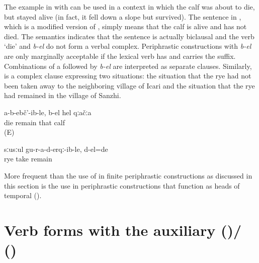 The example in  with  can be used in a context in which the calf was about to die, but stayed alive (in fact, it fell down a slope but survived). The sentence in , which is a modified version of , simply means that the calf is alive and has not died. The semantics indicates that the sentence is actually biclausal and the verb `die' and \textit{b-el} do not form a verbal complex. Periphrastic constructions with \textit{b-el} are only marginally acceptable if the lexical verb has  and carries the  suffix. Combinations of a  followed by \textit{b-el} are interpreted as separate clauses. Similarly,  is a complex clause expressing two situations: the situation that the rye had not been taken away to the neighboring village of Icari and the situation that the rye had remained in the village of Sanzhi. 

\begin{exe}
	\ex	\label{ex:The calf, not having died, is alive b-el}
	\gll	a-b-ebč'-ib-le,	b-el	hel	qːačːa\\
		die	remain	that	calf\\
	\glt	{} (E)
	
	\ex	\label{ex:The rye was still not taken to Icari (it was left untaken) b-el}
	\gll	sːusːul	gu-r-a-d-erqː-ib-le,	d-el=de	\\
		rye	take	remain	\\
	\glt	{}
\end{exe}



More frequent than the use of  in finite periphrastic constructions as discussed in this section is the use in periphrastic constructions that function as heads of temporal  ().



\section[Verb forms with the auxiliary \protect\tit{b-irχʷ-} (\protect\tsc{ipfv})/\protect\tit{b-iχʷ-} (\protect\tsc{pfv})]{Verb forms with the auxiliary \protect{} (\protect{})/\protect{} (\protect{}) \protect{}}
\label{sec:Verb forms with the auxiliary b-irxw- (ipfv) / b-ixw- (pfv) be, become, be able}


